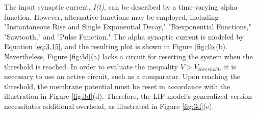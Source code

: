 \noindent The input synaptic current, \textit{I(t)}, can be described by a time-varying alpha function. However, alternative functions may be employed, including "Instantaneous Rise and Single Exponential Decay," "Biexponential Functions," "Sawtooth," and "Pulse Function." The alpha synaptic current is modeled by Equation \ref{eq:3.15}, and the resulting plot is shown in Figure \ref{fig:4b}(b). \\

\noindent Nevertheless, Figure \ref{fig:3d}(a) lacks a circuit for resetting the system when the threshold is reached. In order to evaluate the inequality $V > V_{threshold}$, it is necessary to use an active circuit, such as a comparator. Upon reaching the threshold, the membrane potential must be reset in accordance with the illustration in Figure \ref{fig:3d}(d). Therefore, the LIF model's generalized version necessitates additional overhead, as illustrated in Figure \ref{fig:3d}(e). \\





